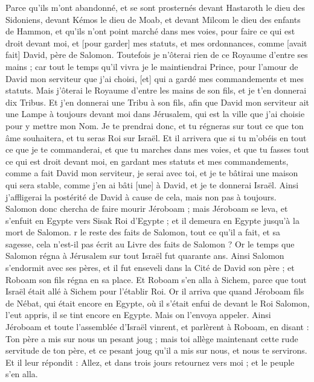 \begin{multicols}{2}
Parce qu'ils m'ont abandonné, et se sont prosternés devant Hastaroth le dieu des Sidoniens, devant Kémos le dieu de Moab, et devant Milcom le dieu des enfants de Hammon, et qu'ils n'ont point marché dans mes voies, pour faire ce qui est droit devant moi, et [pour garder] mes statuts, et mes ordonnances, comme [avait fait] David, père de Salomon.
Toutefois je n'ôterai rien de ce Royaume d'entre ses mains ; car tout le temps qu'il vivra je le maintiendrai Prince, pour l'amour de David mon serviteur que j'ai choisi, [et] qui a gardé mes commandements et mes statuts.
Mais j'ôterai le Royaume d'entre les mains de son fils, et je t'en donnerai dix Tribus.
Et j'en donnerai une Tribu à son fils, afin que David mon serviteur ait une Lampe à toujours devant moi dans Jérusalem, qui est la ville que j'ai choisie pour y mettre mon Nom.
Je te prendrai donc, et tu régneras sur tout ce que ton âme souhaitera, et tu seras Roi sur Israël.
Et il arrivera que si tu m'obéis en tout ce que je te commanderai, et que tu marches dans mes voies, et que tu fasses tout ce qui est droit devant moi, en gardant mes statuts et mes commandements, comme a fait David mon serviteur, je serai avec toi, et je te bâtirai une maison qui sera stable, comme j'en ai bâti [une] à David, et je te donnerai Israël.
Ainsi j'affligerai la postérité de David à cause de cela, mais non pas à toujours.
Salomon donc chercha de faire mourir Jéroboam ; mais Jéroboam se leva, et s'enfuit en Egypte vers Sisak Roi d'Egypte ; et il demeura en Egypte jusqu'à la mort de Salomon.
r le reste des faits de Salomon, tout ce qu'il a fait, et sa sagesse, cela n'est-il pas écrit au Livre des faits de Salomon ?
Or le temps que Salomon régna à Jérusalem sur tout Israël fut quarante ans.
Ainsi Salomon s'endormit avec ses pères, et il fut enseveli dans la Cité de David son père ; et Roboam son fils régna en sa place.
\VerseOne{}Et Roboam s'en alla à Sichem, parce que tout Israël était allé à Sichem pour l'établir Roi.
Or il arriva que quand Jéroboam fils de Nébat, qui était encore en Egypte, où il s'était enfui de devant le Roi Salomon, l'eut appris, il se tint encore en Egypte.
Mais on l'envoya appeler. Ainsi Jéroboam et toute l'assemblée d'Israël vinrent, et parlèrent à Roboam, en disant :
Ton père a mis sur nous un pesant joug ; mais toi allège maintenant cette rude servitude de ton père, et ce pesant joug qu'il a mis sur nous, et nous te servirons.
Et il leur répondit : Allez, et dans trois jours retournez vers moi ; et le peuple s'en alla.

\end{multicols}
